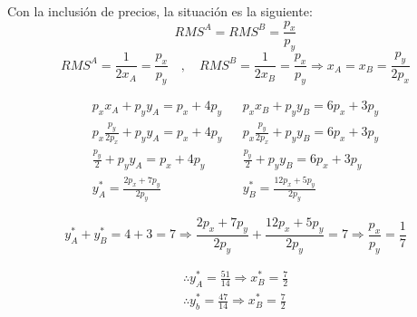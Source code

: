 Con la inclusión de precios, la situación es la siguiente:
	$$RMS^A = RMS^B = \frac{p_x}{p_y}$$
	$$RMS^A=\frac{1}{2x_A}=\frac{p_x}{p_y} \quad , \quad RMS^B=\frac{1}{2x_B}=\frac{p_x}{p_y} \Longrightarrow x_A = x_B = \frac{p_y}{2p_x}$$
	
	$$
		\begin{array}{ccc}
			p_xx_A + p_yy_A = p_x + 4p_y & {} &p_xx_B + p_yy_B = 6p_x + 3p_y\\[0.4cm]
			p_x\frac{p_y}{2p_x} + p_yy_A = p_x + 4p_y & {} &p_x\frac{p_y}{2p_x} + p_yy_B = 6p_x + 3p_y\\[0.4cm]
			\frac{p_y}{2} + p_yy_A = p_x + 4p_y & {} & \frac{p_y}{2} + p_yy_B = 6p_x + 3p_y \\[0.4cm]
			y_{A}^* = \frac{2p_x + 7p_y}{2p_y} & {} & y_{B}^* = \frac{12p_x + 5p_y}{2p_y}
		\end{array}
	$$
	
	$$y_{A}^* + y_{B}^* = 4 + 3 = 7 \Longrightarrow \frac{2p_x + 7p_y}{2p_y} + \frac{12p_x + 5p_y}{2p_y} = 7  \Longrightarrow  \frac{p_x}{p_y} = \frac{1}{7}$$
	
	\begin{gather*}
		\therefore y_{A}^* = \frac{51}{14}  \Longrightarrow x_{B}^* = \frac{7}{2}\\[0.4cm]
		\therefore y_{b}^* = \frac{47}{14}  \Longrightarrow x_{B}^* = \frac{7}{2}
	\end{gather*}

